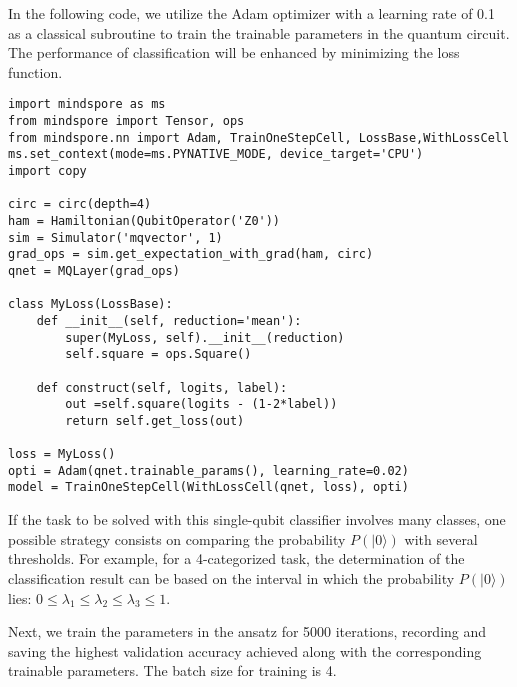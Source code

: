 In the following code, we utilize the Adam optimizer with a learning rate of 0.1 as a classical subroutine to train the trainable parameters in the quantum circuit. The performance of classification will be enhanced by minimizing the loss function.


\begin{lstlisting}
import mindspore as ms
from mindspore import Tensor, ops
from mindspore.nn import Adam, TrainOneStepCell, LossBase,WithLossCell
ms.set_context(mode=ms.PYNATIVE_MODE, device_target='CPU')
import copy

circ = circ(depth=4)
ham = Hamiltonian(QubitOperator('Z0'))
sim = Simulator('mqvector', 1)
grad_ops = sim.get_expectation_with_grad(ham, circ)
qnet = MQLayer(grad_ops)

class MyLoss(LossBase):
    def __init__(self, reduction='mean'):
        super(MyLoss, self).__init__(reduction)
        self.square = ops.Square()

    def construct(self, logits, label):
        out =self.square(logits - (1-2*label))
        return self.get_loss(out)

loss = MyLoss()
opti = Adam(qnet.trainable_params(), learning_rate=0.02)
model = TrainOneStepCell(WithLossCell(qnet, loss), opti)

\end{lstlisting}
If the task to be solved with this single-qubit classifier involves many classes, one possible strategy consists on comparing the probability $P(|0\rangle)$ with several thresholds. For example, for a 4-categorized task, the determination of the classification result can be based on the interval in which the probability $P(|0\rangle)$ lies: $0\leqslant\lambda_1\leqslant\lambda_2\leqslant\lambda_3\leqslant1$.

Next, we train the parameters in the ansatz for 5000 iterations, recording and saving the highest validation accuracy achieved along with the corresponding trainable parameters. The batch size for training is 4.

